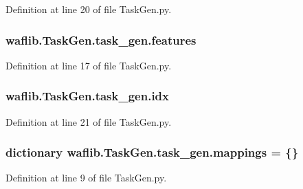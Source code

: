 Definition at line 20 of file Task\+Gen.\+py.

\subsubsection[{\texorpdfstring{features}{features}}]{\setlength{\rightskip}{0pt plus 5cm}waflib.\+Task\+Gen.\+task\+\_\+gen.\+features}\hypertarget{classwaflib_1_1_task_gen_1_1task__gen_a34a129d5641c33405e46c3b3936742f2}{}\label{classwaflib_1_1_task_gen_1_1task__gen_a34a129d5641c33405e46c3b3936742f2}


Definition at line 17 of file Task\+Gen.\+py.

\subsubsection[{\texorpdfstring{idx}{idx}}]{\setlength{\rightskip}{0pt plus 5cm}waflib.\+Task\+Gen.\+task\+\_\+gen.\+idx}\hypertarget{classwaflib_1_1_task_gen_1_1task__gen_aa2f14ba06acda993094f0e84ed50bc0c}{}\label{classwaflib_1_1_task_gen_1_1task__gen_aa2f14ba06acda993094f0e84ed50bc0c}


Definition at line 21 of file Task\+Gen.\+py.

\subsubsection[{\texorpdfstring{mappings}{mappings}}]{\setlength{\rightskip}{0pt plus 5cm}dictionary waflib.\+Task\+Gen.\+task\+\_\+gen.\+mappings = \{\}\hspace{0.3cm}{\ttfamily [static]}}\hypertarget{classwaflib_1_1_task_gen_1_1task__gen_ada504359c458b7f0ab7997d2f43496e9}{}\label{classwaflib_1_1_task_gen_1_1task__gen_ada504359c458b7f0ab7997d2f43496e9}


Definition at line 9 of file Task\+Gen.\+py.

